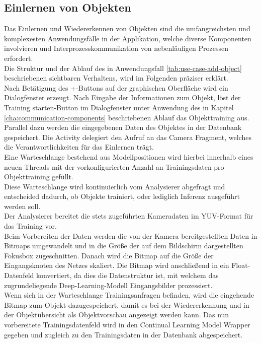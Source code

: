 \documentclass[oneside]{ausarbeitung}
\begin{document}
\subsection{Einlernen von Objekten}
\label{cha:train-objects}
Das Einlernen und Wiedererkennen von Objekten sind die umfangreichsten und komplexesten Anwendungsfälle in der Applikation, welche diverse Komponenten involvieren und Interprozesskommunikation von nebenläufigen Prozessen erfordert.\\
Die Struktur und der Ablauf des in Anwendungsfall \ref{tab:use-case-add-object} beschriebenen sichtbaren Verhaltens, wird im Folgenden präziser erklärt.\\
Nach Betätigung des \glqq +\grqq-Buttons auf der graphischen Oberfläche wird ein Dialogfenster erzeugt. Nach Eingabe der Informationen zum Objekt, löst der \glqq Training starten\grqq-Button im Dialogfenster unter Anwendung des in Kapitel \ref{cha:communication-components} beschriebenen Ablauf das Objekttraining aus. Parallel dazu werden die eingegebenen Daten des Objektes in der Datenbank gespeichert. Die Activity delegiert den Aufruf an das Camera Fragment, welches die Verantwortlichkeiten für das Einlernen trägt. \\
Eine Warteschlange bestehend aus Modellpositionen wird hierbei innerhalb eines neuen Threads mit der vorkonfigurierten Anzahl an Trainingsdaten pro Objekttraining gefüllt.\\
Diese Warteschlange wird kontinuierlich vom Analysierer abgefragt und entscheided dadurch, ob Objekte trainiert, oder lediglich Inferenz ausgeführt werden soll.\\
Der Analysierer bereitet die stets zugeführten Kameradaten im YUV-Format für das Training vor.\\
Beim Vorbereiten der Daten werden die von der Kamera bereitgestellten Daten in Bitmaps umgewandelt und in die Größe der auf dem Bildschirm dargestellten Fokusbox zugeschnitten. Danach wird die Bitmap auf die Größe der Eingangsknoten des Netzes skaliert. Die Bitmap wird anschließend in ein Float-Datenfeld konvertiert, da dies die Datenstruktur ist, mit welchem das zugrundeliegende Deep-Learning-Modell Eingangsbilder prozessiert.\\
Wenn sich in der Warteschlange Trainingsanfragen befinden, wird die eingehende Bitmap zum Objekt dazugespeichert, damit es bei der Wiedererkennung und in der Objektübersicht als Objektvorschau angezeigt werden kann. Das nun vorbereitete Trainingsdatenfeld wird in den Continual Learning Model Wrapper gegeben und zugleich zu den Trainingsdaten in der Datenbank abgespeichert.\\
\end{document}
